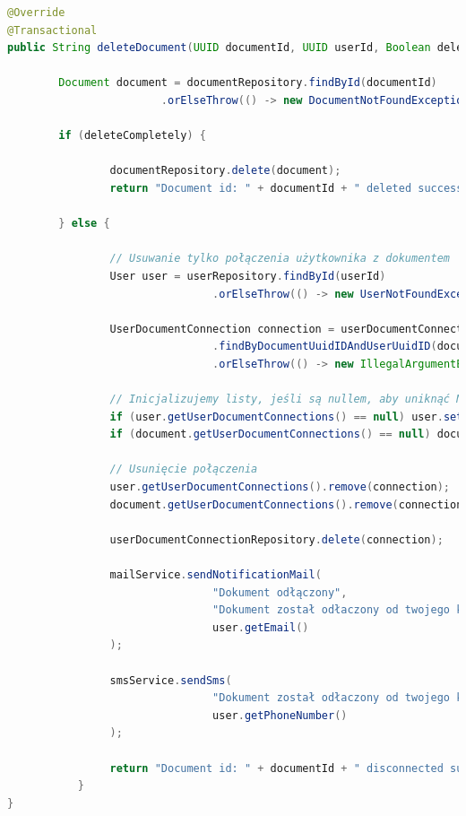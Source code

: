 \begin{lstlisting}[language=Java, style=JavaStyle, caption=Metoda usuwania dokumetów i konretnych połaczeń z dokumentami w klasie \texttt{DocumentServiceImp}]
@Override
@Transactional
public String deleteDocument(UUID documentId, UUID userId, Boolean deleteCompletely) throws DocumentNotFoundException, UserNotFoundException, IllegalArgumentException {

		Document document = documentRepository.findById(documentId)
						.orElseThrow(() -> new DocumentNotFoundException("Document id: " + documentId + " not found"));

		if (deleteCompletely) {

				documentRepository.delete(document);
				return "Document id: " + documentId + " deleted successfully for all users";

		} else {

				// Usuwanie tylko połączenia użytkownika z dokumentem
				User user = userRepository.findById(userId)
								.orElseThrow(() -> new UserNotFoundException("User id: " + userId + " not found"));

				UserDocumentConnection connection = userDocumentConnectionRepository
								.findByDocumentUuidIDAndUserUuidID(documentId, userId)
								.orElseThrow(() -> new IllegalArgumentException("Connection not found"));

				// Inicjalizujemy listy, jeśli są nullem, aby uniknąć NullPointerException
				if (user.getUserDocumentConnections() == null) user.setUserDocumentConnections(new ArrayList<>());
				if (document.getUserDocumentConnections() == null) document.setUserDocumentConnections(new ArrayList<>());

				// Usunięcie połączenia
				user.getUserDocumentConnections().remove(connection);
				document.getUserDocumentConnections().remove(connection);

				userDocumentConnectionRepository.delete(connection);

				mailService.sendNotificationMail(
								"Dokument odłączony",
								"Dokument został odłaczony od twojego konta: " + document.getDocumentName(),
								user.getEmail()
				);

				smsService.sendSms(
								"Dokument został odłaczony od twojego konta: " + document.getDocumentName(),
								user.getPhoneNumber()
				);

				return "Document id: " + documentId + " disconnected successfully for user id: " + userId;
		   }
}
\end{lstlisting}


